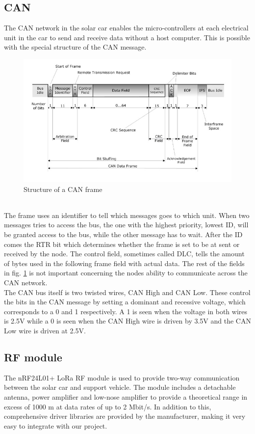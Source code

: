 \documentclass[conference]{IEEEtran}
\begin{document}
\subsection{CAN} %
The CAN network in the solar car enables the micro-controllers at each electrical unit in the car to send and receive data without a host computer. This is possible with the special structure of the CAN message.\\
\begin{figure}[h]
    \includegraphics[scale=0.35]{documentation/images/detailed-can-data-frame-architecture.jpg}
    \caption{Structure of a CAN frame}
    \label{fig:CANframe}
\end{figure}\\
The frame uses an identifier to tell which messages goes to which unit. When two messages tries to access the bus, the one with the highest priority, lowest ID, will be granted access to the bus, while the other message has to wait. After the ID comes the RTR bit which determines whether the frame is set to be at sent or received by the node. The control field, sometimes called DLC, tells the amount of bytes used in the following frame field with actual data. The rest of the fields in fig. \ref{fig:CANframe} is not important concerning the nodes ability to communicate across the CAN network.\\
The CAN bus itself is two twisted wires, CAN High and CAN Low. These control the bits in the CAN message by setting a dominant and recessive voltage, which corresponds to a 0 and 1 respectively. A 1 is seen when the voltage in both wires is 2.5V while a 0 is seen when the CAN High wire is driven by 3.5V and the CAN Low wire is driven at 2.5V. 
\subsection{RF module} %
The nRF24L01+ LoRa RF module is used to provide two-way communication between the solar car and support vehicle. The module includes a detachable antenna, power amplifier and low-nose amplifier to provide a theoretical range in excess of 1000 m at data rates of up to 2 Mbit/s.  In addition to this, comprehensive driver libraries are provided by the manufacturer, making it very easy to integrate with our project. \\
\end{document}
